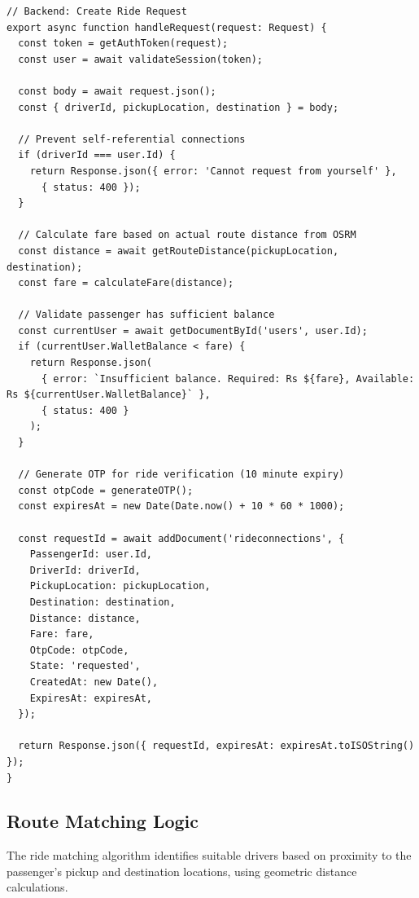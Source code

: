 \documentclass[10pt,a4paper]{report}
\begin{document}
\begin{verbatim}
// Backend: Create Ride Request
export async function handleRequest(request: Request) {
  const token = getAuthToken(request);
  const user = await validateSession(token);
  
  const body = await request.json();
  const { driverId, pickupLocation, destination } = body;

  // Prevent self-referential connections
  if (driverId === user.Id) {
    return Response.json({ error: 'Cannot request from yourself' }, 
      { status: 400 });
  }

  // Calculate fare based on actual route distance from OSRM
  const distance = await getRouteDistance(pickupLocation, destination);
  const fare = calculateFare(distance);

  // Validate passenger has sufficient balance
  const currentUser = await getDocumentById('users', user.Id);
  if (currentUser.WalletBalance < fare) {
    return Response.json(
      { error: `Insufficient balance. Required: Rs ${fare}, Available: Rs ${currentUser.WalletBalance}` },
      { status: 400 }
    );
  }

  // Generate OTP for ride verification (10 minute expiry)
  const otpCode = generateOTP();
  const expiresAt = new Date(Date.now() + 10 * 60 * 1000);

  const requestId = await addDocument('rideconnections', {
    PassengerId: user.Id,
    DriverId: driverId,
    PickupLocation: pickupLocation,
    Destination: destination,
    Distance: distance,
    Fare: fare,
    OtpCode: otpCode,
    State: 'requested',
    CreatedAt: new Date(),
    ExpiresAt: expiresAt,
  });

  return Response.json({ requestId, expiresAt: expiresAt.toISOString() });
}
\end{verbatim}

\subsection{Route Matching Logic}

\justify\large The ride matching algorithm identifies suitable drivers based on proximity to the passenger's pickup and destination locations, using geometric distance calculations.
\end{document}
